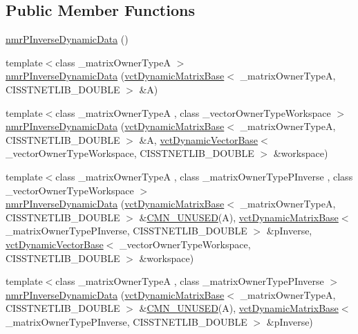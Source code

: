 \subsection*{Public Member Functions}
\begin{DoxyCompactItemize}
\item 
\hyperlink{classnmr_p_inverse_dynamic_data_a3855d7122f40063562732a47c3674584}{nmr\-P\-Inverse\-Dynamic\-Data} ()
\item 
{\footnotesize template$<$class \-\_\-matrix\-Owner\-Type\-A $>$ }\\\hyperlink{classnmr_p_inverse_dynamic_data_abf2e6f7bab95820340d2356afc2bb3a9}{nmr\-P\-Inverse\-Dynamic\-Data} (\hyperlink{classvct_dynamic_matrix_base}{vct\-Dynamic\-Matrix\-Base}$<$ \-\_\-matrix\-Owner\-Type\-A, C\-I\-S\-S\-T\-N\-E\-T\-L\-I\-B\-\_\-\-D\-O\-U\-B\-L\-E $>$ \&A)
\item 
{\footnotesize template$<$class \-\_\-matrix\-Owner\-Type\-A , class \-\_\-vector\-Owner\-Type\-Workspace $>$ }\\\hyperlink{classnmr_p_inverse_dynamic_data_ad2e500bdfc629c4a9daae81e641557b5}{nmr\-P\-Inverse\-Dynamic\-Data} (\hyperlink{classvct_dynamic_matrix_base}{vct\-Dynamic\-Matrix\-Base}$<$ \-\_\-matrix\-Owner\-Type\-A, C\-I\-S\-S\-T\-N\-E\-T\-L\-I\-B\-\_\-\-D\-O\-U\-B\-L\-E $>$ \&A, \hyperlink{classvct_dynamic_vector_base}{vct\-Dynamic\-Vector\-Base}$<$ \-\_\-vector\-Owner\-Type\-Workspace, C\-I\-S\-S\-T\-N\-E\-T\-L\-I\-B\-\_\-\-D\-O\-U\-B\-L\-E $>$ \&workspace)
\item 
{\footnotesize template$<$class \-\_\-matrix\-Owner\-Type\-A , class \-\_\-matrix\-Owner\-Type\-P\-Inverse , class \-\_\-vector\-Owner\-Type\-Workspace $>$ }\\\hyperlink{classnmr_p_inverse_dynamic_data_a943d503dccef08a64b5183025c8f7cce}{nmr\-P\-Inverse\-Dynamic\-Data} (\hyperlink{classvct_dynamic_matrix_base}{vct\-Dynamic\-Matrix\-Base}$<$ \-\_\-matrix\-Owner\-Type\-A, C\-I\-S\-S\-T\-N\-E\-T\-L\-I\-B\-\_\-\-D\-O\-U\-B\-L\-E $>$ \&\hyperlink{cmn_portability_8h_a021894e2626935fa2305434b1e893ff6}{C\-M\-N\-\_\-\-U\-N\-U\-S\-E\-D}(A), \hyperlink{classvct_dynamic_matrix_base}{vct\-Dynamic\-Matrix\-Base}$<$ \-\_\-matrix\-Owner\-Type\-P\-Inverse, C\-I\-S\-S\-T\-N\-E\-T\-L\-I\-B\-\_\-\-D\-O\-U\-B\-L\-E $>$ \&p\-Inverse, \hyperlink{classvct_dynamic_vector_base}{vct\-Dynamic\-Vector\-Base}$<$ \-\_\-vector\-Owner\-Type\-Workspace, C\-I\-S\-S\-T\-N\-E\-T\-L\-I\-B\-\_\-\-D\-O\-U\-B\-L\-E $>$ \&workspace)
\item 
{\footnotesize template$<$class \-\_\-matrix\-Owner\-Type\-A , class \-\_\-matrix\-Owner\-Type\-P\-Inverse $>$ }\\\hyperlink{classnmr_p_inverse_dynamic_data_ab8b48497e09b286b9f1db40e751b1ca5}{nmr\-P\-Inverse\-Dynamic\-Data} (\hyperlink{classvct_dynamic_matrix_base}{vct\-Dynamic\-Matrix\-Base}$<$ \-\_\-matrix\-Owner\-Type\-A, C\-I\-S\-S\-T\-N\-E\-T\-L\-I\-B\-\_\-\-D\-O\-U\-B\-L\-E $>$ \&\hyperlink{cmn_portability_8h_a021894e2626935fa2305434b1e893ff6}{C\-M\-N\-\_\-\-U\-N\-U\-S\-E\-D}(A), \hyperlink{classvct_dynamic_matrix_base}{vct\-Dynamic\-Matrix\-Base}$<$ \-\_\-matrix\-Owner\-Type\-P\-Inverse, C\-I\-S\-S\-T\-N\-E\-T\-L\-I\-B\-\_\-\-D\-O\-U\-B\-L\-E $>$ \&p\-Inverse)

\end{DoxyCompactItemize}
